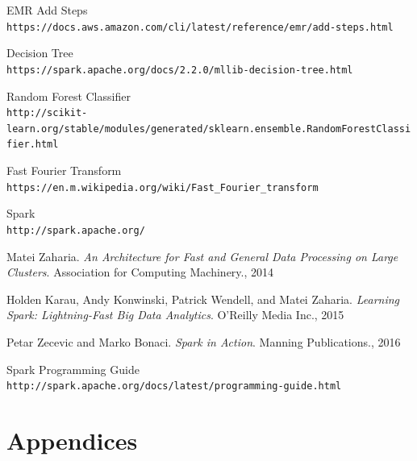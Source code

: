 \documentclass{neu_handout}
\begin{document}
\begin{thebibliography}{9}
EMR Add Steps
\\\texttt{https://docs.aws.amazon.com/cli/latest/reference/emr/add-steps.html}

Decision Tree
\\\texttt{https://spark.apache.org/docs/2.2.0/mllib-decision-tree.html}

Random Forest Classifier
\\\texttt{http://scikit-learn.org/stable/modules/generated/sklearn.ensemble.RandomForestClassifier.html}

Fast Fourier Transform
\\\texttt{https://en.m.wikipedia.org/wiki/Fast\_Fourier\_transform}

Spark
\\\texttt{http://spark.apache.org/}


 Matei Zaharia. \textsl{An Architecture for Fast and General Data Processing on
Large Clusters}. Association for Computing Machinery., 2014

 Holden Karau, Andy Konwinski, Patrick Wendell, and Matei Zaharia. \textsl{Learning Spark: Lightning-Fast Big Data Analytics}. O'Reilly Media Inc., 2015

 Petar Zecevic and Marko Bonaci. \textsl{Spark in Action}. Manning
Publications., 2016

Spark Programming Guide
\\\texttt{http://spark.apache.org/docs/latest/programming-guide.html}

\end{thebibliography}

\newpage

\appendix
\section*{Appendices}
\end{document}

